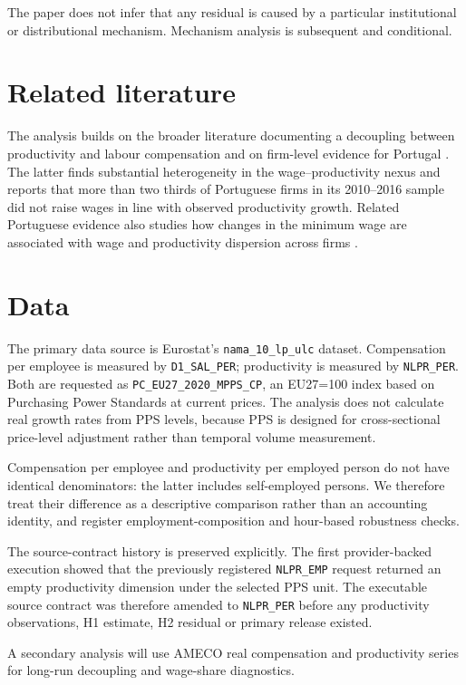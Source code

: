 \documentclass[11pt,a4paper]{article}
\begin{document}
The paper does not infer that any residual is caused by a particular institutional or distributional mechanism. Mechanism analysis is subsequent and conditional.

\section{Related literature}
The analysis builds on the broader literature documenting a decoupling between productivity and labour compensation \citep{schwellnus2017} and on firm-level evidence for Portugal \citep{mergulhao2021}. The latter finds substantial heterogeneity in the wage--productivity nexus and reports that more than two thirds of Portuguese firms in its 2010--2016 sample did not raise wages in line with observed productivity growth. Related Portuguese evidence also studies how changes in the minimum wage are associated with wage and productivity dispersion across firms \citep{afonso2023}.

\section{Data}
The primary data source is Eurostat's \texttt{nama\_10\_lp\_ulc} dataset. Compensation per employee is measured by \texttt{D1\_SAL\_PER}; productivity is measured by \texttt{NLPR\_PER}. Both are requested as \texttt{PC\_EU27\_2020\_MPPS\_CP}, an EU27=100 index based on Purchasing Power Standards at current prices. The analysis does not calculate real growth rates from PPS levels, because PPS is designed for cross-sectional price-level adjustment rather than temporal volume measurement.

Compensation per employee and productivity per employed person do not have identical denominators: the latter includes self-employed persons. We therefore treat their difference as a descriptive comparison rather than an accounting identity, and register employment-composition and hour-based robustness checks.

The source-contract history is preserved explicitly. The first provider-backed execution showed that the previously registered \texttt{NLPR\_EMP} request returned an empty productivity dimension under the selected PPS unit. The executable source contract was therefore amended to \texttt{NLPR\_PER} before any productivity observations, H1 estimate, H2 residual or primary release existed.

A secondary analysis will use AMECO real compensation and productivity series for long-run decoupling and wage-share diagnostics.
\end{document}
